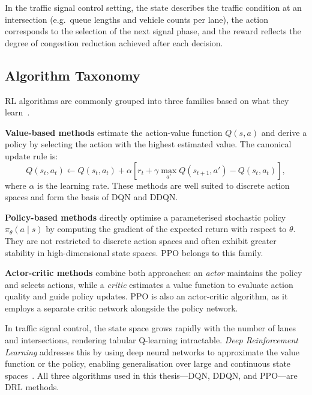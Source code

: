 In the traffic signal control setting, the state describes the traffic condition at
an intersection (e.g.\ queue lengths and vehicle counts per lane), the action
corresponds to the selection of the next signal phase, and the reward reflects the
degree of congestion reduction achieved after each decision.

\subsection{Algorithm Taxonomy}

RL algorithms are commonly grouped into three families based on what they
learn~\cite{sutton2018reinforcement}.

\textbf{Value-based methods} estimate the action-value function $Q(s,a)$ and derive
a policy by selecting the action with the highest estimated value. The canonical
update rule is:
\[
  Q(s_t,a_t) \leftarrow Q(s_t,a_t)
  + \alpha\!\left[r_t + \gamma\max_{a'} Q(s_{t+1},a') - Q(s_t,a_t)\right],
\]
where $\alpha$ is the learning rate. These methods are well suited to discrete
action spaces and form the basis of DQN and DDQN.

\textbf{Policy-based methods} directly optimise a parameterised stochastic policy
$\pi_\theta(a \mid s)$ by computing the gradient of the expected return with
respect to $\theta$. They are not restricted to discrete action spaces and often
exhibit greater stability in high-dimensional state spaces. PPO belongs to this
family.

\textbf{Actor-critic methods} combine both approaches: an \textit{actor} maintains
the policy and selects actions, while a \textit{critic} estimates a value function
to evaluate action quality and guide policy updates. PPO is also an actor-critic
algorithm, as it employs a separate critic network alongside the policy network.

In traffic signal control, the state space grows rapidly with the number of lanes
and intersections, rendering tabular Q-learning intractable. \textit{Deep
Reinforcement Learning} addresses this by using deep neural networks to
approximate the value function or the policy, enabling generalisation over large
and continuous state spaces~\cite{mnih2015humanlevel}. All three algorithms used in
this thesis---DQN, DDQN, and PPO---are DRL methods.

